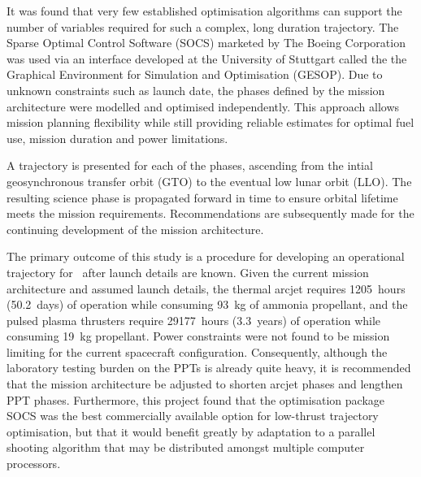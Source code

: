 It was found that very few established optimisation algorithms can support the number of variables required for such a complex, long duration trajectory. The Sparse Optimal Control Software (SOCS) marketed by The Boeing Corporation was used via an interface developed at the University of Stuttgart called the the Graphical Environment for Simulation and Optimisation (GESOP). Due to unknown constraints such as launch date, the phases defined by the mission architecture were modelled and optimised independently. This approach allows mission planning flexibility while still providing reliable estimates for optimal fuel use, mission duration and power limitations.

A trajectory is presented for each of the phases, ascending from the intial geosynchronous transfer orbit (GTO) to the eventual low lunar orbit (LLO). The resulting science phase is propagated forward in time to ensure orbital lifetime meets the mission requirements. Recommendations are subsequently made for the continuing development of the mission architecture.

The primary outcome of this study is a procedure for developing an operational trajectory for \BW\ after launch details are known. Given the current mission architecture and assumed launch details, the thermal arcjet requires 1205~hours (50.2~days) of operation while consuming 93~kg of ammonia propellant, and the pulsed plasma thrusters require 29177~hours (3.3~years) of operation while consuming 19~kg propellant. Power constraints were not found to be mission limiting for the current spacecraft configuration. Consequently, although the laboratory testing burden on the PPTs is already quite heavy, it is recommended that the mission architecture be adjusted to shorten arcjet phases and lengthen PPT phases. Furthermore, this project found that the optimisation package SOCS was the best commercially available option for low-thrust trajectory optimisation, but that it would benefit greatly by adaptation to a parallel shooting algorithm that may be distributed amongst multiple computer processors.

\vfill